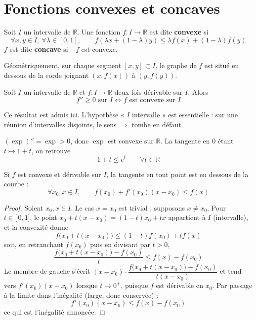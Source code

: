 \section{Fonctions convexes et concaves}

\begin{defi}
Soit $I$ un intervalle de $\mathbb{R}$. Une fonction $f:I\to\mathbb{R}$ est dite \textbf{convexe} si
\[\forall x,y\in I,\ \forall \lambda\in[0,1], \qquad f(\lambda x+(1-\lambda)y) \leq \lambda f(x)+(1-\lambda) f(y)\]
$f$ est dite \textbf{concave} si $-f$ est convexe.
\end{defi}

Géométriquement, sur chaque segment $[x,y]\subset I$, le graphe de $f$ est situé en dessous de la corde joignant $(x,f(x))$ à $(y,f(y))$.

\begin{prop}
Soit $I$ un intervalle de $\mathbb{R}$ et $f:I\to\mathbb{R}$ deux fois dérivable sur $I$. Alors
\[f'' \geq 0 \text{ sur } I \iff f \text{ est convexe sur } I\]
\end{prop}

\begin{remarque}
Ce résultat est admis ici. L'hypothèse « $I$ intervalle » est essentielle : sur une réunion d'intervalles disjoints, le sens $\Rightarrow$ tombe en défaut.
\end{remarque}

\begin{exemple}
$(\exp)''=\exp > 0$, donc $\exp$ est convexe sur $\mathbb{R}$. La tangente en $0$ étant $t\mapsto 1+t$, on retrouve
\[1+t \leq e^t \qquad \forall t\in\mathbb{R}\]
\end{exemple}

\begin{prop}
Si $f$ est convexe et dérivable sur $I$, la tangente en tout point est en dessous de la courbe :
\[\forall x_0,x\in I, \qquad f(x_0)+f'(x_0)(x-x_0) \leq f(x)\]
\end{prop}

\begin{proof}
Soient $x_0,x\in I$. Le cas $x=x_0$ est trivial ; supposons $x\neq x_0$. Pour $t\in\,]0,1]$, le point $x_0+t(x-x_0) = (1-t)x_0+tx$ appartient à $I$ (intervalle), et la convexité donne
\[f\big(x_0+t(x-x_0)\big) \leq (1-t)f(x_0)+t f(x)\]
soit, en retranchant $f(x_0)$ puis en divisant par $t>0$,
\[\frac{f\big(x_0+t(x-x_0)\big)-f(x_0)}{t} \leq f(x)-f(x_0)\]
Le membre de gauche s'écrit $(x-x_0)\cdot\dfrac{f\big(x_0+t(x-x_0)\big)-f(x_0)}{t(x-x_0)}$ et tend vers $f'(x_0)(x-x_0)$ lorsque $t\to 0^+$, puisque $f$ est dérivable en $x_0$. Par passage à la limite dans l'inégalité (large, donc conservée) :
\[f'(x_0)(x-x_0) \leq f(x)-f(x_0)\]
ce qui est l'inégalité annoncée.
\end{proof}

